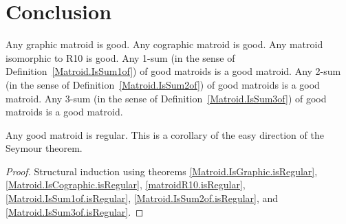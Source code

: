 \section{Conclusion}

\begin{definition}
    \label{Matroid.IsGood}
    \leanok
    Any graphic matroid is good.
    Any cographic matroid is good.
    Any matroid isomorphic to R10 is good.
    Any 1-sum (in the sense of Definition~\ref{Matroid.IsSum1of}) of good matroids is a good matroid.
    Any 2-sum (in the sense of Definition~\ref{Matroid.IsSum2of}) of good matroids is a good matroid.
    Any 3-sum (in the sense of Definition~\ref{Matroid.IsSum3of}) of good matroids is a good matroid.
\end{definition}

\begin{corollary}
    \label{Matroid.IsGood.isRegular}
    \leanok
    Any good matroid is regular. This is a corollary of the easy direction of the Seymour theorem.
\end{corollary}

\begin{proof}
    Structural induction
using theorems \ref{Matroid.IsGraphic.isRegular},
\ref{Matroid.IsCographic.isRegular},
\ref{matroidR10.isRegular},
\ref{Matroid.IsSum1of.isRegular},
\ref{Matroid.IsSum2of.isRegular}, and
\ref{Matroid.IsSum3of.isRegular}.
\end{proof}
